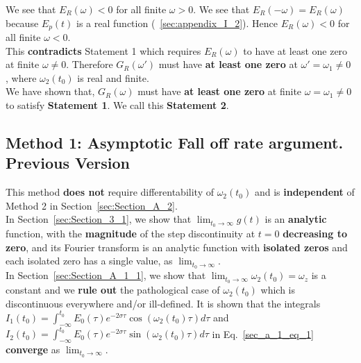 \documentclass[11pt]{elsarticle}
\begin{document}
We see that  $E_{R}(\omega) < 0$ for all finite $\omega > 0$. We see that $E_{R}(-\omega)= E_{R}(\omega)$ because $E_p(t)$ is a real function (~\ref{sec:appendix_I_2}). Hence $E_{R}(\omega) < 0$ for all finite $\omega < 0$.\\


This \textbf{contradicts} Statement 1 which requires $E_{R}(\omega)$ to have at least one zero at finite $\omega \neq 0$. Therefore $G_{R}(\omega')$ must have\textbf{ at least one zero} at $\omega' =  \omega_1 \neq 0$ , where $\omega_{2}(t_0)$ is real and finite. \\



We have shown that, $G_{R}(\omega)$ must have\textbf{ at least one zero} at finite $\omega =  \omega_1 \neq 0$ to satisfy \textbf{Statement 1}. We call this \textbf{Statement 2}. 


\clearpage
\subsection{\label{Appendix_D_7} \textbf{ Method 1: Asymptotic Fall off rate argument. Previous Version} \protect\\  \lowercase{} }

This method \textbf{does not} require differentability of $\omega_2(t_0)$ and is \textbf{independent} of Method 2 in Section~\ref{sec:Section_A_2}.\\

In Section~\ref{sec:Section_3_1}, we show that $\lim_{t_0 \to \infty} g(t)$ is an \textbf{analytic} function, with the \textbf{magnitude} of the step discontinuity at $t=0$ \textbf{decreasing to zero}, and its Fourier transform is an analytic function with \textbf{isolated zeros} and each isolated zero has a single value, as $\lim_{t_0 \to \infty}$. \\ %

In Section~\ref{sec:Section_A_1_1}, we show that $\lim_{t_0 \to \infty} \omega_{2}(t_0) = \omega_z $ is a constant and we \textbf{rule  out} the pathological case of $\omega_{2}(t_0)$ which is discontinuous everywhere and/or ill-defined. It is shown that the integrals $I_1(t_0) =  \int_{-\infty}^{t_0}     E_{0}( \tau)  e^{ -2 \sigma \tau}  \cos{ (\omega_2(t_0) \tau)} d\tau$ and $I_2(t_0) =  \int_{-\infty}^{t_0}  E_{0}( \tau)  e^{ -2 \sigma \tau}  \sin{ (\omega_2(t_0) \tau)} d\tau$ in Eq.~\ref{sec_a_1_eq_1} \textbf{converge} as $\lim_{t_0 \to \infty}$.
\\%
\end{document}
